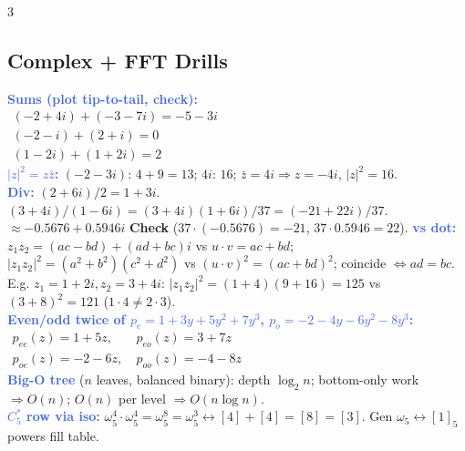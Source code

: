 \documentclass[9pt]{extarticle}
\newcommand{\wk}[1]{\textbf{\textcolor{OliveGreen}{#1}}}
\newcommand{\ex}[1]{\textbf{\textcolor{RoyalBlue}{#1}}}
\begin{document}
\begin{multicols}{3}
\subsection{Complex + FFT Drills}
\begin{sloppypar}\raggedright
\ex{Sums (plot tip-to-tail, check):}\\
$\begin{array}{l}
(-2+4i)+(-3-7i)=-5-3i\\
(-2-i)+(2+i)=0\\
(1-2i)+(1+2i)=2
\end{array}$\\
\ex{$|z|^2{=}z\bar z$:} $({-}2{-}3i)$: $4{+}9{=}13$; $4i$: $16$; $\bar z{=}4i\Rightarrow z{=}{-}4i$, $|z|^2{=}16$.\\
\ex{Div:} $(2{+}6i)/2{=}1{+}3i$. $(3{+}4i)/(1{-}6i){=}(3{+}4i)(1{+}6i)/37{=}({-}21{+}22i)/37$.\\
${\approx}{-}0.5676{+}0.5946i$ \wk{Check} ($37{\cdot}({-}0.5676){=}{-}21$, $37{\cdot}0.5946{=}22$). \ex{vs dot:} $z_1z_2{=}(ac{-}bd){+}(ad{+}bc)i$ vs $u{\cdot}v{=}ac{+}bd$; $|z_1z_2|^2{=}(a^2{+}b^2)(c^2{+}d^2)$ vs $(u{\cdot}v)^2{=}(ac{+}bd)^2$; coincide $\iff ad{=}bc$.\\
E.g. $z_1{=}1{+}2i,z_2{=}3{+}4i$: $|z_1z_2|^2{=}(1{+}4)(9{+}16){=}125$ vs $(3{+}8)^2{=}121$ ($1{\cdot}4{\ne}2{\cdot}3$).\\
\ex{Even/odd twice of $p_e{=}1{+}3y{+}5y^2{+}7y^3$, $p_o{=}{-}2{-}4y{-}6y^2{-}8y^3$:}\\
$\begin{array}{ll}
p_{ee}(z){=}1{+}5z,\ &p_{eo}(z){=}3{+}7z\\
p_{oe}(z){=}{-}2{-}6z,\ &p_{oo}(z){=}{-}4{-}8z
\end{array}$\\
\ex{Big-O tree} ($n$ leaves, balanced binary): depth $\log_2n$; bottom-only work $\Rightarrow O(n)$; $O(n)$ per level $\Rightarrow O(n\log n)$.\\
\ex{$C_5^*$ row via iso:} $\omega_5^4{\cdot}\omega_5^4{=}\omega_5^8{=}\omega_5^3\leftrightarrow[4]{+}[4]{=}[8]{=}[3]$. Gen $\omega_5\leftrightarrow[1]_5$ powers fill table.
\end{sloppypar}


\end{multicols}
\end{document}
